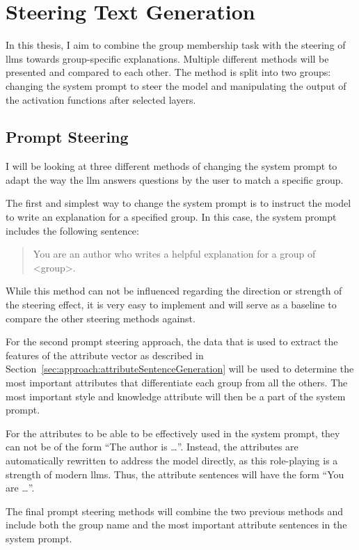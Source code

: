 \section{Steering Text Generation}
In this thesis, I aim to combine the group membership task with the steering of \acp{llm} towards group-specific explanations. Multiple different methods will be presented and compared to each other. The method is split into two groups: changing the system prompt to steer the model and manipulating the output of the activation functions after selected layers.

\subsection{Prompt Steering}
\label{sec:approach:steering:prompt}
I will be looking at three different methods of changing the system prompt to adapt the way the \ac{llm} answers questions by the user to match a specific group.

The first and simplest way to change the system prompt is to instruct the model to write an explanation for a specified group. In this case, the system prompt includes the following sentence:
\begin{quote}
  You are an author who writes a helpful explanation for a group of <group>.
\end{quote}

While this method can not be influenced regarding the direction or strength of the steering effect, it is very easy to implement and will serve as a baseline to compare the other steering methods against.

For the second prompt steering approach, the data that is used to extract the features of the attribute vector as described in Section~\ref{sec:approach:attributeSentenceGeneration} will be used to determine the most important attributes that differentiate each group from all the others. The most important style and knowledge attribute will then be a part of the system prompt.

For the attributes to be able to be effectively used in the system prompt, they can not be of the form \enquote{The author is \ldots}. Instead, the attributes are automatically rewritten to address the model directly, as this role-playing is a strength of modern \aclp{llm}. %
Thus, the attribute sentences will have the form \enquote{You are \ldots}.

The final prompt steering methods will combine the two previous methods and include both the group name and the most important attribute sentences in the system prompt.

